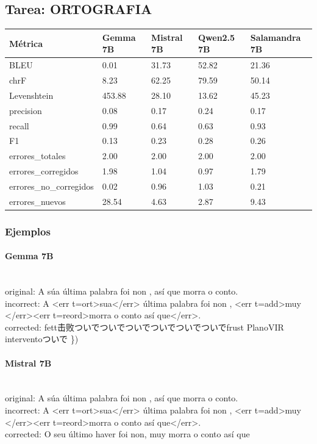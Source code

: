 \subsection{Tarea: ORTOGRAFIA}\label{tarea-ortografia}
{\def\LTcaptype{none}
\begin{longtable}[]{@{}lllll@{}}
\toprule\noalign{}
Métrica & Gemma 7B & Mistral 7B & Qwen2.5 7B & Salamandra 7B \\
\midrule\noalign{}
\endhead
\bottomrule\noalign{}
\endlastfoot
BLEU & 0.01 & 31.73 & 52.82 & 21.36 \\
chrF & 8.23 & 62.25 & 79.59 & 50.14 \\
Levenshtein & 453.88 & 28.10 & 13.62 & 45.23 \\
precision & 0.08 & 0.17 & 0.24 & 0.17 \\
recall & 0.99 & 0.64 & 0.63 & 0.93 \\
F1 & 0.13 & 0.23 & 0.28 & 0.26 \\
errores\_totales & 2.00 & 2.00 & 2.00 & 2.00 \\
errores\_corregidos & 1.98 & 1.04 & 0.97 & 1.79 \\
errores\_no\_corregidos & 0.02 & 0.96 & 1.03 & 0.21 \\
errores\_nuevos & 28.54 & 4.63 & 2.87 & 9.43 \\
\end{longtable}}

\subsubsection{Ejemplos}

\paragraph{Gemma 7B}~\\
{original:} A súa última palabra foi non , así que morra o conto.\\
{incorrect:} A {\textless}err t=ort{\textgreater}sua{\textless}/err{\textgreater} última palabra foi non , {\textless}err t=add{\textgreater}muy {\textless}/err{\textgreater}{\textless}err t=reord{\textgreater}morra o conto así que{\textless}/err{\textgreater}.\\
{corrected:} fett击败ついでついでついでついでついでついでfrust PlanoVIR interventoついで \})\\

\paragraph{Mistral 7B}~\\
{original:} A súa última palabra foi non , así que morra o conto.\\
{incorrect:} A {\textless}err t=ort{\textgreater}sua{\textless}/err{\textgreater} última palabra foi non , {\textless}err t=add{\textgreater}muy {\textless}/err{\textgreater}{\textless}err t=reord{\textgreater}morra o conto así que{\textless}/err{\textgreater}.\\
{corrected:} O seu último haver foi non, muy morra o conto así que\\

